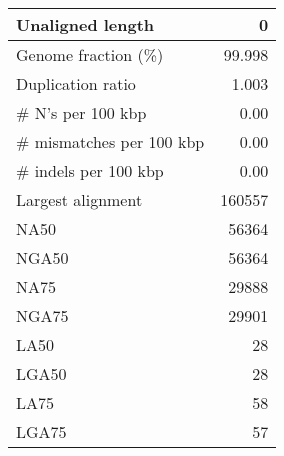 \documentclass[12pt,a4paper]{article}
\begin{document}
\begin{table}[ht]
\begin{center}
\begin{tabular}{|l*{1}{|r}|}
Unaligned length & 0 \\ \hline
Genome fraction (\%) & 99.998 \\ \hline
Duplication ratio & 1.003 \\ \hline
\# N's per 100 kbp & 0.00 \\ \hline
\# mismatches per 100 kbp & 0.00 \\ \hline
\# indels per 100 kbp & 0.00 \\ \hline
Largest alignment & 160557 \\ \hline
NA50 & 56364 \\ \hline
NGA50 & 56364 \\ \hline
NA75 & 29888 \\ \hline
NGA75 & 29901 \\ \hline
LA50 & 28 \\ \hline
LGA50 & 28 \\ \hline
LA75 & 58 \\ \hline
LGA75 & 57 \\ \hline
\end{tabular}
\end{center}
\end{table}
\end{document}
